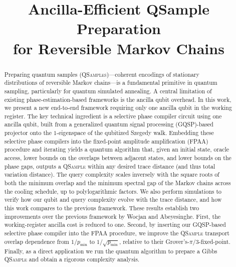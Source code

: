 \documentclass[10pt,conference]{IEEEtran}
\theoremstyle{plain}
\theoremstyle{remark}
\begin{document}
\title{Ancilla-Efficient QSample Preparation\\ for Reversible Markov Chains}

\author{
}

\maketitle

\begin{abstract}
Preparing quantum samples (\textsc{QSamples})---coherent encodings of stationary distributions of reversible Markov chains---is a fundamental primitive in quantum sampling, particularly for quantum simulated annealing. A central limitation of existing phase-estimation-based frameworks is the ancilla qubit overhead. In this work, we present a new end-to-end framework requiring only one ancilla qubit in the working register. The key technical ingredient is a selective phase compiler circuit using one ancilla qubit, built from a generalized quantum signal processing (GQSP)-based projector onto the $1$-eigenspace of the qubitized Szegedy walk. Embedding these selective phase compilers into the fixed-point amplitude amplification (FPAA) procedure and iterating yields a quantum algorithm that, given an initial state, oracle access, lower bounds on the overlaps between adjacent states, and lower bounds on the phase gaps, outputs a \textsc{QSample} within any desired trace distance (and thus total variation distance). The query complexity scales inversely with the square roots of both the minimum overlap and the minimum spectral gap of the Markov chains across the cooling schedule, up to polylogarithmic factors. We also perform simulations to verify how our qubit and query complexity evolve with the trace distance, and how this work compares to the previous framework. These results establish two improvements over the previous framework by Wocjan and Abeyesinghe. First, the working-register ancilla cost is reduced to one. Second, by inserting our GQSP-based selective phase compiler into the FPAA procedure, we improve the \textsc{QSample} transport overlap dependence from \(1/p_{\min}\) to \(1/\sqrt{p_{\min}}\), relative to their Grover's-\(\pi/3\)-fixed-point. Finally, as a direct application we run the quantum algorithm to prepare a Gibbs \textsc{QSample} and obtain a rigorous complexity analysis.
\end{abstract}
\end{document}
